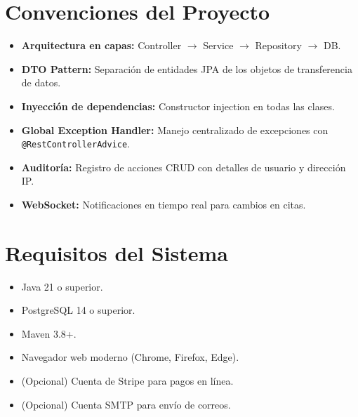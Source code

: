 \section{Convenciones del Proyecto}

\begin{itemize}
    \item \textbf{Arquitectura en capas:} Controller $\rightarrow$ Service $\rightarrow$ Repository $\rightarrow$ DB.
    \item \textbf{DTO Pattern:} Separaci\'on de entidades JPA de los objetos de transferencia de datos.
    \item \textbf{Inyecci\'on de dependencias:} Constructor injection en todas las clases.
    \item \textbf{Global Exception Handler:} Manejo centralizado de excepciones con \texttt{@RestControllerAdvice}.
    \item \textbf{Auditor\'ia:} Registro de acciones CRUD con detalles de usuario y direcci\'on IP.
    \item \textbf{WebSocket:} Notificaciones en tiempo real para cambios en citas.
\end{itemize}

\section{Requisitos del Sistema}

\begin{itemize}
    \item Java 21 o superior.
    \item PostgreSQL 14 o superior.
    \item Maven 3.8+.
    \item Navegador web moderno (Chrome, Firefox, Edge).
    \item (Opcional) Cuenta de Stripe para pagos en l\'inea.
    \item (Opcional) Cuenta SMTP para env\'io de correos.
\end{itemize}

